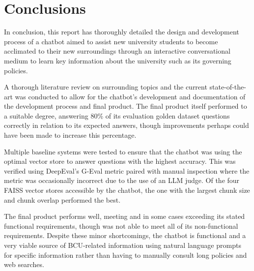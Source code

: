 \chapter{Conclusions}

In conclusion, this report has thoroughly detailed the design and development process of a chatbot aimed to assist new university students 
to become acclimated to their new surroundings through an interactive conversational medium to learn key information about the university 
such as its governing policies.

\para A thorough literature review on surrounding topics and the current state-of-the-art was conducted to allow for the chatbot's development
and documentation of the development process and final product. The final product itself performed to a suitable degree, answering 80\% of its 
evaluation golden dataset questions correctly in relation to its expected answers, though improvements perhaps could have been made to increase this 
percentage.

\para Multiple baseline systems were tested to ensure that the chatbot was using the optimal vector store to answer questions with the highest 
accuracy. This was verified using DeepEval's G-Eval metric paired with manual inspection where the metric was occasionally incorrect due to the 
use of an LLM judge. Of the four FAISS vector stores accessible by the chatbot, the one with the largest chunk size and chunk overlap performed 
the best.

\para The final product performs well, meeting and in some cases exceeding its stated functional requirements, though was not 
able to meet all of its non-functional requirements. Despite these minor shortcomings, the chatbot is functional and a very viable source of 
BCU-related information using natural language prompts for specific information rather than having to manually consult long policies and web searches. 


\nocite{projectGithub} %
